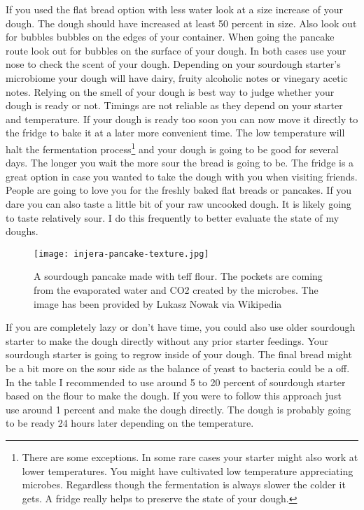 If you used the flat bread option with less water look at a size increase
of your dough. The dough should have increased at least 50 percent in size.
Also look out for bubbles bubbles on the edges of your container.
When going the pancake route look out for bubbles on the surface of your dough.
In both cases use your nose to check the scent of your dough. Depending
on your sourdough starter's microbiome your dough will have 
dairy, fruity alcoholic notes or vinegary acetic notes. Relying
on the smell of your dough is best way to judge whether your
dough is ready or not. Timings are not reliable as they
depend on your starter and temperature. If your dough
is ready too soon you can now move it directly to the fridge to bake
it at a later more convenient time. The low temperature will halt the fermentation
process\footnote{There are some exceptions. In some rare cases your starter
might also work at lower temperatures. You might have cultivated low temperature appreciating
microbes. Regardless though the fermentation
is always slower the colder it gets. A fridge really helps to preserve the state
of your dough.}
and your dough is going to be good for several days. The longer you wait the more sour the
bread is going to be. The fridge is a great option in case you wanted to
take the dough with you when visiting friends. People are going
to love you for the freshly baked flat breads or pancakes. If you dare
you can also taste a little bit of your raw uncooked dough. It is likely
going to taste relatively sour. I do this frequently to better evaluate the
state of my doughs.


\begin{figure}[htb!]
  \texttt{[image: injera-pancake-texture.jpg]}
  \centering
  \caption{A sourdough pancake made with teff flour. The pockets are coming from
  the evaporated water and CO2 created by the microbes.
  The image has been provided by Lukasz Nowak via Wikipedia}
\end{figure}

If you are completely lazy or don't have time, you could also use older sourdough starter
to make the dough directly without any prior starter feedings. Your sourdough starter
is going to regrow inside of your dough. The
final bread might be a bit more on the sour side as the balance of yeast to
bacteria could be a off. In the table I recommended to use around 5 to 20 percent
of sourdough starter based on the flour to make the dough. If you were to follow
this approach just use around 1 percent and make the dough directly.
The dough is probably going to be ready 24 hours later depending on the temperature.

